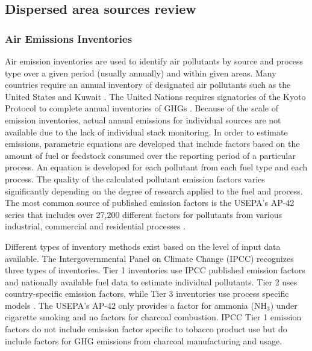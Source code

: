 \clearpage
\subsection{Dispersed area sources review}

\subsubsection{Air Emissions Inventories}

Air emission inventories are used to identify air pollutants by source and process type over a given period (usually annually) and within given areas.  Many countries require an annual inventory of designated air pollutants such as the United States \citep{USEPA2014} and Kuwait \citep{KEPA2017}.  The United Nations requires signatories of the Kyoto Protocol to complete annual inventories of GHGs \citep{Paciornik2006}.  Because of the scale of emission inventories, actual annual emissions for individual sources are not available due to the lack of individual stack monitoring. In order to estimate emissions, parametric equations are developed that include factors based on the amount of fuel or feedstock consumed over the reporting period of a particular process.  An equation is developed for each pollutant from each fuel type and each process.  The quality of the calculated pollutant emission factors varies significantly depending on the degree of research applied to the fuel and process.  The most common source of published emission factors is the USEPA’s AP-42 series that includes over 27,200 different factors for pollutants from various industrial, commercial and residential processes \citep{USEPA1995}.

Different types of inventory methods exist based on the level of input data available. The Intergovernmental Panel on Climate Change (IPCC) recognizes three types of inventories.  Tier 1 inventories use IPCC published emission factors and nationally available fuel data to estimate individual pollutants.  Tier 2 uses country-specific emission factors, while Tier 3 inventories use process specific models \citep{Paciornik2006}.  The USEPA’s AP-42 only provides a factor for ammonia (NH$_{3}$) under cigarette smoking and no factors for charcoal combustion.  IPCC Tier 1 emission factors do not include emission factor specific to tobacco product use but do include factors for GHG emissions from charcoal manufacturing and usage. 

